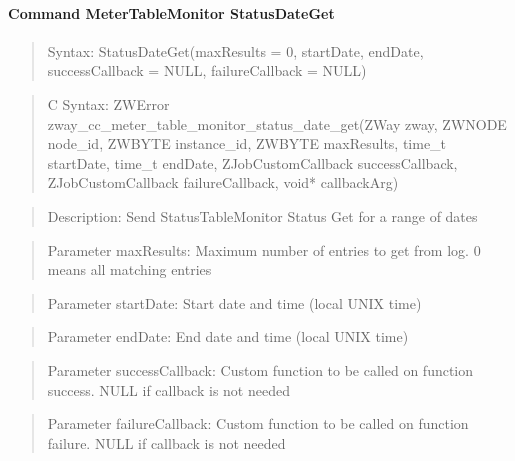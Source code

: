\paragraph{Command MeterTableMonitor StatusDateGet}
\begin{quote}Syntax: StatusDateGet(maxResults = 0, startDate, endDate, successCallback = NULL, failureCallback = NULL)\end{quote}
\begin{quote}C Syntax: ZWError zway\_cc\_meter\_table\_monitor\_status\_date\_get(ZWay zway, ZWNODE node\_id, ZWBYTE instance\_id, ZWBYTE maxResults, time\_t startDate, time\_t endDate, ZJobCustomCallback successCallback, ZJobCustomCallback failureCallback, void* callbackArg)\end{quote}
\begin{quote}Description: Send StatusTableMonitor Status Get for a range of dates\end{quote}
\begin{quote}Parameter maxResults: Maximum number of entries to get from log. 0 means all matching entries\end{quote}
\begin{quote}Parameter startDate: Start date and time (local UNIX time)\end{quote}
\begin{quote}Parameter endDate: End date and time (local UNIX time)\end{quote}
\begin{quote}Parameter successCallback: Custom function to be called on function success. NULL if callback is not needed\end{quote}
\begin{quote}Parameter failureCallback: Custom function to be called on function failure. NULL if callback is not needed\end{quote}


